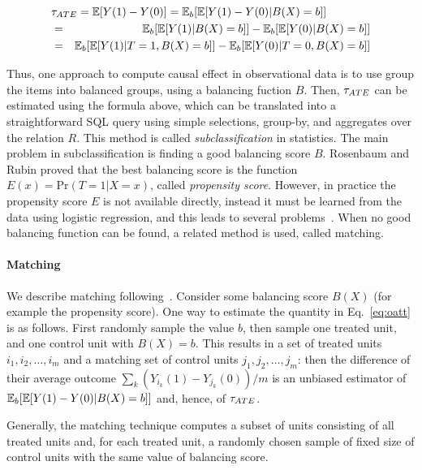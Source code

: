 \begin{eqnarray}
\lefteqn{\ate = \E[Y(1)-Y(0)] = \E_b[\E[Y(1)-Y(0)| B(X)=b]]} \label{eq:oatt} \\
  &=& \E_b[\E[Y(1)|B(X)=b]]-\E_b[\E[Y(0)|B(X)=b]] \nonumber \\
  &=& \E_b[\E[Y(1)|T=1,B(X)=b]]-\E_b[\E[Y(0)|T=0,B(X)=b]] \nonumber
\end{eqnarray}



Thus, one approach to compute causal effect in observational data is
to use group the items into balanced groups, using a balancing fuction
$B$.  Then, ${\tau_{ATE}}$ can be estimated using the formula above, which can
be translated into a straightforward SQL query using simple
selections, group-by, and aggregates over the relation $R$.  This
method is called {\em subclassification} in statistics.  The main
problem in subclassification is finding a good balancing score $B$.
Rosenbaum and Rubin proved that the best balancing score is the
function $E(x) = \textrm{Pr}(T = 1 | X=x)$, called {\em propensity
  score}.  However, in practice the propensity score $E$ is not
available directly, instead it must be learned from the data using
logistic regression, and this leads to several
problems~\cite{king15}.  When no good balancing function can be found,
a related method is used, called matching.


\vspace{-.25cm}

\paragraph*{Matching} We describe matching
following~\cite{Rubin1983b}.  Consider some balancing score $B(X)$
(for example the propensity score).  One way to estimate the quantity
in Eq.~\ref{eq:oatt} is as follows.  First randomly sample the value
$b$, then sample one treated unit, and one control unit with $B(X)=b$.
This results in a set of treated units $i_1, i_2, \ldots, i_m$ and a
matching set of control units $j_1, j_2, \ldots, j_m$: then the
difference of their average outcome
$\sum_k (Y_{i_k}(1) - Y_{j_k}(0))/m$ is an unbiased estimator of
$\mathbb{E}_b[\mathbb{E}[Y(1)-Y(0)| B(X)=b]]$ and, hence, of ${\tau_{ATE}}$.    Generally, the
matching technique computes a subset of units consisting of all
treated units and, for each treated unit, a randomly chosen sample of
fixed size of control units with the same value of balancing score.

